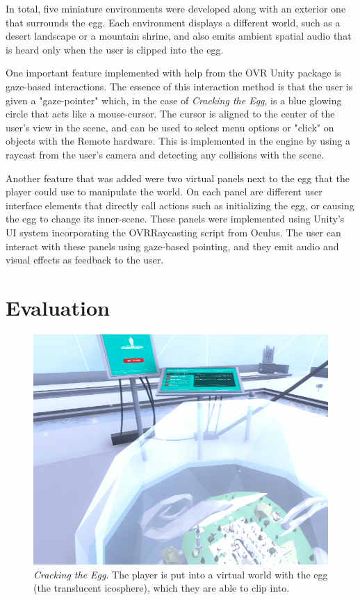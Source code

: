 \documentclass[10pt,twocolumn,letterpaper]{article}
\begin{document}
In total, five miniature environments were developed along with an exterior one that surrounds the egg. Each environment displays a different world, such as a desert landscape or a mountain shrine, and also emits ambient spatial audio that is heard only when the user is clipped into the egg.

One important feature implemented with help from the OVR Unity package is gaze-based interactions. The essence of this interaction method is that the user is given a "gaze-pointer" which, in the case of \textit{Cracking the Egg}, is a blue glowing circle that acts like a mouse-cursor. The cursor is aligned to the center of the user's view in the scene, and can be used to select menu options or "click" on objects with the Remote hardware. This is implemented in the engine by using a raycast from the user's camera and detecting any collisions with the scene.

Another feature that was added were two virtual panels next to the egg that the player could use to manipulate the world. On each panel are different user interface elements that directly call actions such as initializing the egg, or causing the egg to change its inner-scene. These panels were implemented using Unity's UI system incorporating the OVRRaycasting script from Oculus. The user can interact with these panels using gaze-based pointing, and they emit audio and visual effects as feedback to the user.



\section{Evaluation}

\begin{figure}[t]
\begin{center}
\includegraphics[width=1.0\linewidth]{images/crackingtheegg.png}
\end{center}
   \caption{\textit{Cracking the Egg}.  The player is put into a virtual world with the egg (the translucent icosphere), which they are able to clip into. }
\label{fig:long}
\label{fig:onecol}
\end{figure}
\end{document}
